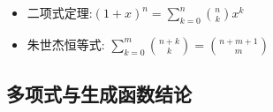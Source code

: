\begin{itemize}
        变体：
        \begin{itemize}
            \item $\displaystyle\sum_{i=0}^k C_{i+n}^{i}=C_{k+n+1}^{k}$ ;
            \item $\displaystyle\sum_{i=0}^k C_{n}^{i} \cdot C_m^i=\sum_{i=0}^k C_{n}^{i} \cdot C_m^{m-i}=C_{n+m}^{n}$ 。
        \end{itemize}
    \item 二项式定理:$ (1+x)^n = \displaystyle\sum_{k=0}^{n} \binom{n}{k} x^k$
    \item 朱世杰恒等式:  $\displaystyle\sum_{k=0}^{m} \binom{n+k}{k} = \binom{n+m+1}{m}$
\end{itemize}



\subsection{多项式与生成函数结论}
